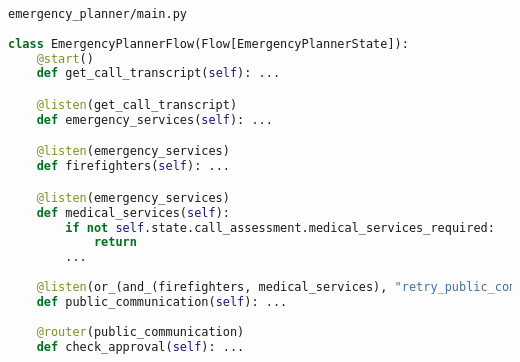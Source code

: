 \begin{frame}[fragile]{\texttt{emergency\_planner/main.py}}
    \vspace{-0.3cm}
    \begin{lstlisting}[language=Python]
class EmergencyPlannerFlow(Flow[EmergencyPlannerState]):
    @start()
    def get_call_transcript(self): ...

    @listen(get_call_transcript)
    def emergency_services(self): ...

    @listen(emergency_services)
    def firefighters(self): ...

    @listen(emergency_services)
    def medical_services(self):
        if not self.state.call_assessment.medical_services_required:
            return
        ...
    
    @listen(or_(and_(firefighters, medical_services), "retry_public_communication"))
    def public_communication(self): ...
    
    @router(public_communication)
    def check_approval(self): ...
\end{lstlisting}
\end{frame}